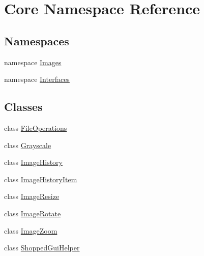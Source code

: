 \hypertarget{namespace_core}{
\section{Core Namespace Reference}
\label{namespace_core}
}
\subsection*{Namespaces}
\begin{DoxyCompactItemize}
\item 
namespace \hyperlink{namespace_core_1_1_images}{Images}
\item 
namespace \hyperlink{namespace_core_1_1_interfaces}{Interfaces}
\end{DoxyCompactItemize}
\subsection*{Classes}
\begin{DoxyCompactItemize}
\item 
class \hyperlink{class_core_1_1_file_operations}{FileOperations}
\item 
class \hyperlink{class_core_1_1_grayscale}{Grayscale}
\item 
class \hyperlink{class_core_1_1_image_history}{ImageHistory}
\item 
class \hyperlink{class_core_1_1_image_history_item}{ImageHistoryItem}
\item 
class \hyperlink{class_core_1_1_image_resize}{ImageResize}
\item 
class \hyperlink{class_core_1_1_image_rotate}{ImageRotate}
\item 
class \hyperlink{class_core_1_1_image_zoom}{ImageZoom}
\item 
class \hyperlink{class_core_1_1_shopped_gui_helper}{ShoppedGuiHelper}
\end{DoxyCompactItemize}
